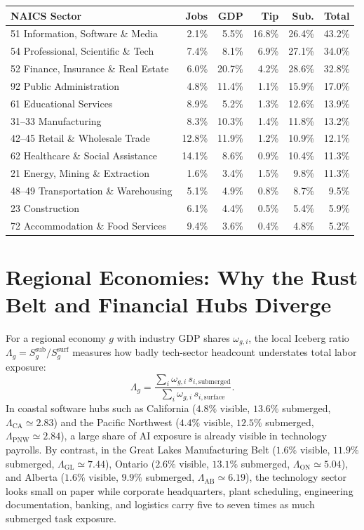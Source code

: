 \documentclass[11pt]{article}
\begin{document}
\begin{center}
\begin{tabular}{p{5.8cm}rrrrr}
\hline
\textbf{NAICS Sector} & \textbf{Jobs} & \textbf{GDP} & \textbf{Tip} & \textbf{Sub.} & \textbf{Total} \\
\hline
51 Information, Software \& Media & 2.1\% & 5.5\% & 16.8\% & 26.4\% & 43.2\% \\
54 Professional, Scientific \& Tech & 7.4\% & 8.1\% & 6.9\% & 27.1\% & 34.0\% \\
52 Finance, Insurance \& Real Estate & 6.0\% & 20.7\% & 4.2\% & 28.6\% & 32.8\% \\
92 Public Administration & 4.8\% & 11.4\% & 1.1\% & 15.9\% & 17.0\% \\
61 Educational Services & 8.9\% & 5.2\% & 1.3\% & 12.6\% & 13.9\% \\
31--33 Manufacturing & 8.3\% & 10.3\% & 1.4\% & 11.8\% & 13.2\% \\
42--45 Retail \& Wholesale Trade & 12.8\% & 11.9\% & 1.2\% & 10.9\% & 12.1\% \\
62 Healthcare \& Social Assistance & 14.1\% & 8.6\% & 0.9\% & 10.4\% & 11.3\% \\
21 Energy, Mining \& Extraction & 1.6\% & 3.4\% & 1.5\% & 9.8\% & 11.3\% \\
48--49 Transportation \& Warehousing & 5.1\% & 4.9\% & 0.8\% & 8.7\% & 9.5\% \\
23 Construction & 6.1\% & 4.4\% & 0.5\% & 5.4\% & 5.9\% \\
72 Accommodation \& Food Services & 9.4\% & 3.6\% & 0.4\% & 4.8\% & 5.2\% \\
\hline
\end{tabular}
\end{center}

\section{Regional Economies: Why the Rust Belt and Financial Hubs Diverge}
\label{sec:regional-map}
For a regional economy $g$ with industry GDP shares $\omega_{g,i}$, the local Iceberg ratio $\Lambda_g = S_g^{\text{sub}} / S_g^{\text{surf}}$ measures how badly tech-sector headcount understates total labor exposure:
\begin{equation}
\Lambda_g = \frac{\sum_i \omega_{g,i}\, s_{i,\text{submerged}}}{\sum_i \omega_{g,i}\, s_{i,\text{surface}}}.
\label{eq:regional-ratio}
\end{equation}
In coastal software hubs such as California ($4.8\%$ visible, $13.6\%$ submerged, $\Lambda_{\text{CA}} \simeq 2.83$) and the Pacific Northwest ($4.4\%$ visible, $12.5\%$ submerged, $\Lambda_{\text{PNW}} \simeq 2.84$), a large share of AI exposure is already visible in technology payrolls. By contrast, in the Great Lakes Manufacturing Belt ($1.6\%$ visible, $11.9\%$ submerged, $\Lambda_{\text{GL}} \simeq 7.44$), Ontario ($2.6\%$ visible, $13.1\%$ submerged, $\Lambda_{\text{ON}} \simeq 5.04$), and Alberta ($1.6\%$ visible, $9.9\%$ submerged, $\Lambda_{\text{AB}} \simeq 6.19$), the technology sector looks small on paper while corporate headquarters, plant scheduling, engineering documentation, banking, and logistics carry five to seven times as much submerged task exposure.
\end{document}
